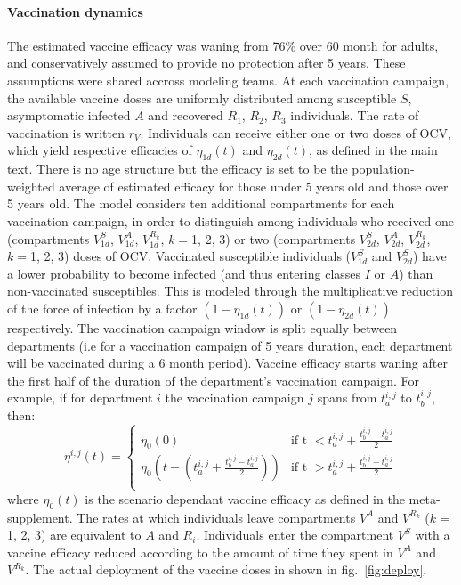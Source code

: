 \paragraph{Vaccination dynamics} The estimated vaccine efficacy was waning from 76\% over 60 month for adults, and conservatively assumed to provide no protection after 5 years. These assumptions were shared accross modeling teams. 
At each vaccination campaign, the available vaccine doses are uniformly distributed among susceptible $S$, asymptomatic infected $A$ and recovered $R_{1}$, $R_2$, $R_3$ individuals. The rate of vaccination is written $r_V$. Individuals can receive either one or two doses of OCV, which yield respective efficacies of $\eta_{1d}(t)$ and $\eta_{2d}(t)$, as defined in the main text. There is no age structure but the efficacy is set to be the population-weighted average of estimated efficacy for those under 5 years old and those over 5 years old.
 The model considers ten additional compartments for each vaccination campaign, in order to distinguish among individuals who received one (compartments $V^S_{1d}$, $V^A_{1d}$, $V^{R_k}_{1d}$, $k=$1, 2, 3) or two (compartments $V^S_{2d}$, $V^A_{2d}$, $V^{R_k}_{2d}$, $k=$1, 2, 3) doses of OCV. Vaccinated susceptible individuals ($V^S_{1d}$ and $V^S_{2d}$) have a lower probability to become infected (and thus entering classes $I$ or $A$) than non-vaccinated susceptibles. This is modeled through the multiplicative reduction of the force of infection by a  factor $(1-\eta_{1d}(t))$ or $(1-\eta_{2d}(t))$ respectively.
The vaccination campaign window is split equally between departments (i.e for a vaccination campaign of 5 years duration, each department will be vaccinated during a 6 month period). Vaccine efficacy starts waning after the first half of the duration of the department's vaccination campaign. For example, if for department $i$ the vaccination campaign $j$ spans from $t^{i,j}_a$ to $t^{i,j}_b$, then:
    \begin{equation}
\eta^{i,j}(t) = \left\{
    \begin{array}{ll}
        \eta_0(0) & \mbox{if t $<  t^{i,j}_a + \frac{t^{i,j}_b - t^{i,j}_a}{2}$} \\
        \eta_0(t -  (t^{i,j}_a +  \frac{t^{i,j}_b - t^{i,j}_a}{2}) ) & \mbox{if t $>  t^{i,j}_a + \frac{t^{i,j}_b - t^{i,j}_a}{2}$} \\
    \end{array}
\right.
\end{equation}
where $\eta_0(t)$ is the scenario dependant vaccine efficacy as defined in the meta-supplement.
The rates at which individuals leave compartments $V^A$ and $V^{R_k}$ ($k=$1, 2, 3) are equivalent to $A$ and $R_i$. Individuals enter the compartment $V^S$ with a vaccine efficacy reduced according to the amount of time they spent in $V^A$ and $V^{R_k}$. The actual deployment of the vaccine doses in shown in fig.~\ref{fig:deploy}.

